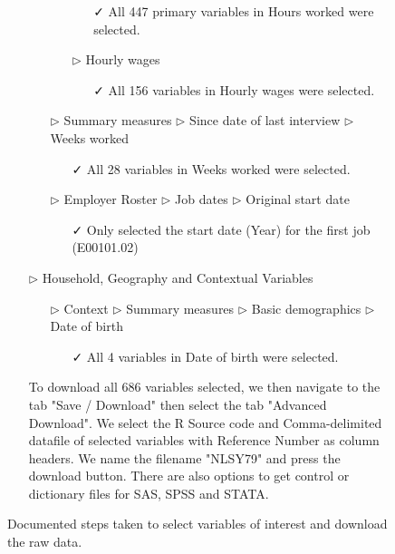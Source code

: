 \documentclass{article}
\begin{document}
\begin{figure}[t]
\begin{tcolorbox}[title = Navigating the data source]
\begin{itemize}
\begin{itemize}
\begin{itemize}
\begin{itemize}
\item[\faCheck] All 447 primary variables in Hours worked were selected.
\end{itemize}
\item[$\triangleright$] Hourly wages
\begin{itemize}
\item[\faCheck] All 156 variables in Hourly wages were selected.
\end{itemize}
\end{itemize}
\end{itemize}
\begin{itemize}
\item[$\triangleright$] Summary measures $\triangleright$ Since date of last interview $\triangleright$ Weeks worked
\begin{itemize}
\item[\faCheck] All 28 variables in Weeks worked were selected.
\end{itemize}
\end{itemize}
\begin{itemize}
\item[$\triangleright$] Employer Roster $\triangleright$ Job dates $\triangleright$ Original start date
\begin{itemize}
\item[\faCheck] Only selected the start date (Year) for the first job (E00101.02)
\end{itemize}
\end{itemize}
\item[$\triangleright$] Household, Geography and Contextual Variables
\begin{itemize}
\item[$\triangleright$] Context $\triangleright$ Summary measures $\triangleright$ Basic demographics $\triangleright$ Date of birth
\begin{itemize}
\item[\faCheck] All 4 variables in Date of birth were selected. 
\end{itemize}
\end{itemize}
\end{itemize}
\begin{itemize}
\item[\faCloudDownload] To download all 686 variables selected, we then navigate to the tab "Save / Download" then select the tab "Advanced Download". We select the R Source code and Comma-delimited datafile of selected variables with Reference Number as column headers. We name the filename "NLSY79" and press the download button. There are also options to get control or dictionary files for SAS, SPSS and STATA. 
\end{itemize}
\end{tcolorbox}
\caption{Documented steps taken to select variables of interest and download the raw data.\label{fig:source-nav}}
\end{figure}
\end{document}
